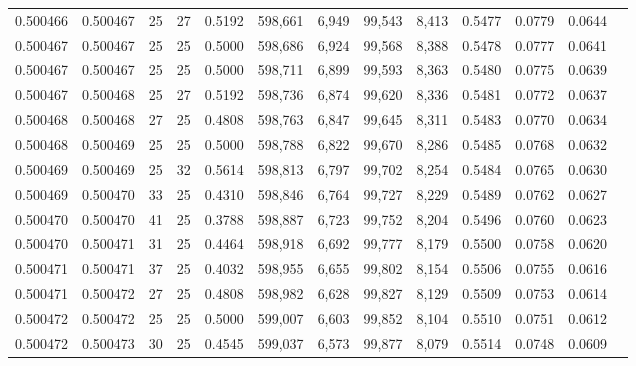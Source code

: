 \begin{tabular}{rrrrrrrrrrrrr}
0.500466 & 0.500467 &    25 &  27 &                                     0.5192 & 598,661 &   6,949 &  99,543 &   8,413 & 0.5477 & 0.0779 & 0.0644 \\
0.500467 & 0.500467 &    25 &  25 &                                     0.5000 & 598,686 &   6,924 &  99,568 &   8,388 & 0.5478 & 0.0777 & 0.0641 \\
0.500467 & 0.500467 &    25 &  25 &                                     0.5000 & 598,711 &   6,899 &  99,593 &   8,363 & 0.5480 & 0.0775 & 0.0639 \\
0.500467 & 0.500468 &    25 &  27 &                                     0.5192 & 598,736 &   6,874 &  99,620 &   8,336 & 0.5481 & 0.0772 & 0.0637 \\
0.500468 & 0.500468 &    27 &  25 &                                     0.4808 & 598,763 &   6,847 &  99,645 &   8,311 & 0.5483 & 0.0770 & 0.0634 \\
0.500468 & 0.500469 &    25 &  25 &                                     0.5000 & 598,788 &   6,822 &  99,670 &   8,286 & 0.5485 & 0.0768 & 0.0632 \\
0.500469 & 0.500469 &    25 &  32 &                                     0.5614 & 598,813 &   6,797 &  99,702 &   8,254 & 0.5484 & 0.0765 & 0.0630 \\
0.500469 & 0.500470 &    33 &  25 &                                     0.4310 & 598,846 &   6,764 &  99,727 &   8,229 & 0.5489 & 0.0762 & 0.0627 \\
0.500470 & 0.500470 &    41 &  25 &                                     0.3788 & 598,887 &   6,723 &  99,752 &   8,204 & 0.5496 & 0.0760 & 0.0623 \\
0.500470 & 0.500471 &    31 &  25 &                                     0.4464 & 598,918 &   6,692 &  99,777 &   8,179 & 0.5500 & 0.0758 & 0.0620 \\
0.500471 & 0.500471 &    37 &  25 &                                     0.4032 & 598,955 &   6,655 &  99,802 &   8,154 & 0.5506 & 0.0755 & 0.0616 \\
0.500471 & 0.500472 &    27 &  25 &                                     0.4808 & 598,982 &   6,628 &  99,827 &   8,129 & 0.5509 & 0.0753 & 0.0614 \\
0.500472 & 0.500472 &    25 &  25 &                                     0.5000 & 599,007 &   6,603 &  99,852 &   8,104 & 0.5510 & 0.0751 & 0.0612 \\
0.500472 & 0.500473 &    30 &  25 &                                     0.4545 & 599,037 &   6,573 &  99,877 &   8,079 & 0.5514 & 0.0748 & 0.0609 \\

\end{tabular}
